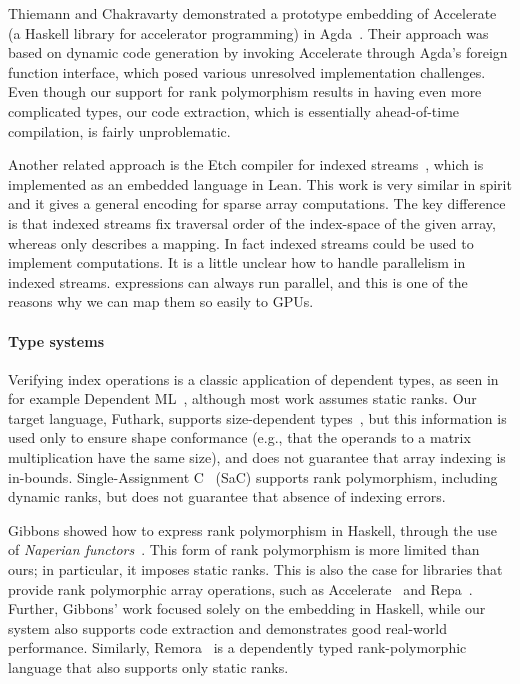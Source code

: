 Thiemann and Chakravarty demonstrated a prototype embedding of
Accelerate~\cite{10.1145/1926354.1926358} (a Haskell library for
accelerator programming) in Agda~\cite{thiemann2013agda}. Their
approach was based on dynamic code generation by invoking Accelerate
through Agda's foreign function interface, which posed various
unresolved implementation challenges. Even though our support for rank
polymorphism results in having even more complicated types, our code
extraction, which is essentially ahead-of-time compilation, is fairly
unproblematic.

Another related approach is the Etch compiler for indexed
streams~\cite{10.1145/3591268}, which is implemented as an embedded
language in Lean.  This work is very similar in spirit and it gives
a general encoding for sparse array computations.  The key difference
is that indexed streams fix traversal order of the index-space
of the given array, whereas  only describes a mapping.
In fact indexed streams could be used to implement 
computations.  It is a little unclear how to handle parallelism
in indexed streams.   expressions can always run parallel,
and this is one of the reasons why we can map them so easily to GPUs.


\paragraph{Type systems}

Verifying index operations is a classic application of dependent types, as seen
in for example Dependent ML~\cite{10.1145/292540.292560}, although most work
assumes static ranks. Our target language, Futhark, supports size-dependent
types~\cite{10.1145/3609024.3609412}, but this information is used only to
ensure shape conformance (e.g., that the operands to a matrix multiplication
have the same size), and does not guarantee that array indexing is in-bounds.
Single-Assignment C~\cite{sac2} (SaC) supports rank polymorphism, including
dynamic ranks, but does not guarantee that absence of indexing errors.

Gibbons showed how to express rank polymorphism in Haskell, through the use of
\emph{Naperian functors}~\cite{10.1145/2976022.2976023}. This form of rank
polymorphism is more limited than ours; in particular, it imposes static ranks.
This is also the case for libraries that provide rank polymorphic array
operations, such as Accelerate~\cite{10.1145/1926354.1926358} and
Repa~\cite{10.1145/1932681.1863582}. Further, Gibbons' work focused solely on
the embedding in Haskell, while our system also supports code extraction and
demonstrates good real-world performance. Similarly, Remora~\cite{rank-poly} is
a dependently typed rank-polymorphic language that also supports only static
ranks.
